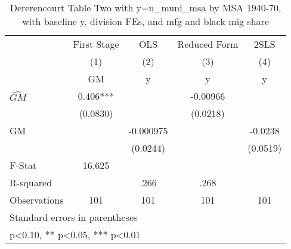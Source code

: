 \begin{table}[htbp]\centering
\def\sym#1{\ifmmode^{#1}\else\(^{#1}\)\fi}
\caption{Dererencourt Table Two with y=n\_muni\_msa by MSA 1940-70, with baseline y, division FEs, and mfg and black mig share}
\begin{tabular}{l*{4}{c}}
\toprule
                    & First Stage   &         OLS   &Reduced Form   &        2SLS   \\
                    &\multicolumn{1}{c}{(1)}&\multicolumn{1}{c}{(2)}&\multicolumn{1}{c}{(3)}&\multicolumn{1}{c}{(4)}\\
                    &\multicolumn{1}{c}{GM}&\multicolumn{1}{c}{y}&\multicolumn{1}{c}{y}&\multicolumn{1}{c}{y}\\
\midrule
$\hat{GM}$          &       0.406***&               &    -0.00966   &               \\
                    &    (0.0830)   &               &    (0.0218)   &               \\
\addlinespace
GM                  &               &   -0.000975   &               &     -0.0238   \\
                    &               &    (0.0244)   &               &    (0.0519)   \\
\midrule
F-Stat              &      16.625   &               &               &               \\
R-squared           &               &        .266   &        .268   &               \\
Observations        &         101   &         101   &         101   &         101   \\
\bottomrule
\multicolumn{5}{l}{\footnotesize Standard errors in parentheses}\\
\multicolumn{5}{l}{\footnotesize * p<0.10, ** p<0.05, *** p<0.01}\\
\end{tabular}
\end{table}
